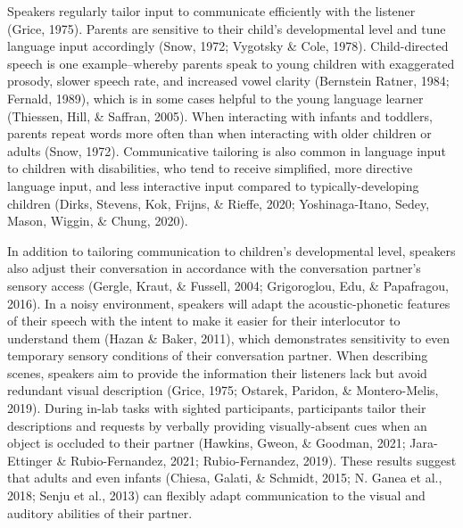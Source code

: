 \documentclass[
  man,floatsintext]{apa6}
\begin{document}
Speakers regularly tailor input to communicate efficiently with the listener (Grice, 1975). Parents are sensitive to their child's developmental level and tune language input accordingly (Snow, 1972; Vygotsky \& Cole, 1978). Child-directed speech is one example--whereby parents speak to young children with exaggerated prosody, slower speech rate, and increased vowel clarity (Bernstein Ratner, 1984; Fernald, 1989), which is in some cases helpful to the young language learner (Thiessen, Hill, \& Saffran, 2005). When interacting with infants and toddlers, parents repeat words more often than when interacting with older children or adults (Snow, 1972). Communicative tailoring is also common in language input to children with disabilities, who tend to receive simplified, more directive language input, and less interactive input compared to typically-developing children (Dirks, Stevens, Kok, Frijns, \& Rieffe, 2020; Yoshinaga-Itano, Sedey, Mason, Wiggin, \& Chung, 2020).

In addition to tailoring communication to children's developmental level, speakers also adjust their conversation in accordance with the conversation partner's sensory access (Gergle, Kraut, \& Fussell, 2004; Grigoroglou, Edu, \& Papafragou, 2016). In a noisy environment, speakers will adapt the acoustic-phonetic features of their speech with the intent to make it easier for their interlocutor to understand them (Hazan \& Baker, 2011), which demonstrates sensitivity to even temporary sensory conditions of their conversation partner. When describing scenes, speakers aim to provide the information their listeners lack but avoid redundant visual description (Grice, 1975; Ostarek, Paridon, \& Montero-Melis, 2019). During in-lab tasks with sighted participants, participants tailor their descriptions and requests by verbally providing visually-absent cues when an object is occluded to their partner (Hawkins, Gweon, \& Goodman, 2021; Jara-Ettinger \& Rubio-Fernandez, 2021; Rubio-Fernandez, 2019). These results suggest that adults and even infants (Chiesa, Galati, \& Schmidt, 2015; N. Ganea et al., 2018; Senju et al., 2013) can flexibly adapt communication to the visual and auditory abilities of their partner.
\end{document}
